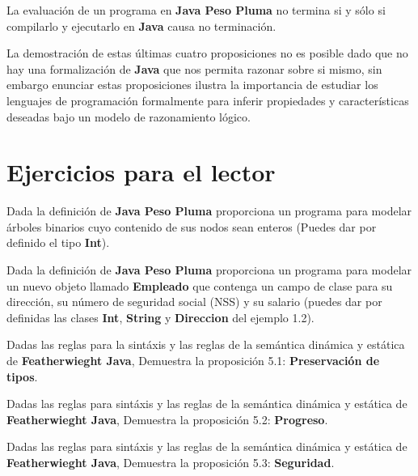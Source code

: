 \bigskip

\begin{definition} La evaluación de un programa en \textbf{Java Peso Pluma} no termina si y sólo si compilarlo y ejecutarlo en \textbf{Java} causa no terminación.
\end{definition}

\bigskip

La demostración de estas últimas cuatro proposiciones no es posible dado que no hay una formalización de \textbf{Java} que nos permita razonar sobre si mismo, sin embargo enunciar estas proposiciones ilustra la importancia de estudiar los lenguajes de programación formalmente para inferir propiedades y características deseadas bajo un modelo de razonamiento lógico.


\section{Ejercicios para el lector}

\begin{exercise}
    Dada la definición de \textbf{Java Peso Pluma} proporciona un programa para modelar árboles binarios cuyo contenido de sus nodos sean enteros (Puedes dar por definido el tipo \textbf{Int}).
\end{exercise}

\bigskip

\begin{exercise}
    Dada la definición de \textbf{Java Peso Pluma} proporciona un programa para modelar un nuevo objeto llamado \textbf{Empleado} que contenga un campo de clase para su dirección, su número de seguridad social (NSS) y su salario (puedes dar por definidas las clases \textbf{Int}, \textbf{String} y \textbf{Direccion} del ejemplo 1.2).
\end{exercise}

\bigskip

\begin{exercise}
    Dadas las reglas para la sintáxis y las reglas de la semántica dinámica y estática de \textbf{Featherwieght Java}, Demuestra la proposición 5.1: \textbf{Preservación de tipos}.
\end{exercise}

\bigskip

\begin{exercise}
   Dadas las reglas para sintáxis y las reglas de la semántica dinámica y estática de \textbf{Featherwieght Java}, Demuestra la proposición 5.2: \textbf{Progreso}.
\end{exercise}

\bigskip

\begin{exercise}
   Dadas las reglas para sintáxis y las reglas de la semántica dinámica y estática de \textbf{Featherwieght Java}, Demuestra la proposición 5.3: \textbf{Seguridad}.
\end{exercise}